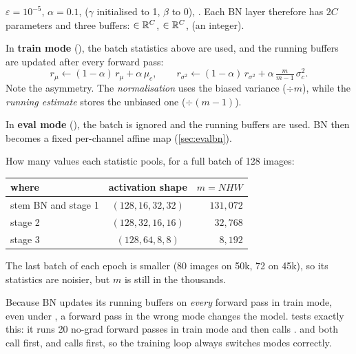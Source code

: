 \begin{repo}
$\varepsilon = 10^{-5}$,  $\alpha=0.1$,  ($\gamma$ initialised to 1, $\beta$ to 0), . Each BN layer therefore has $2C$ parameters and three buffers:  $\in\mathbb{R}^C$,  $\in\mathbb{R}^C$,  (an integer).

In \textbf{train mode} (), the batch statistics above are used, and the running buffers are updated after every forward pass:
\[
  r_\mu \leftarrow (1-\alpha)\,r_\mu + \alpha\,\mu_c, \qquad
  r_{\sigma^2} \leftarrow (1-\alpha)\,r_{\sigma^2} + \alpha\,\tfrac{m}{m-1}\,\sigma_c^2 .
\]
Note the asymmetry. The \emph{normalisation} uses the biased variance ($\div m$), while the \emph{running estimate} stores the unbiased one ($\div(m-1)$).

In \textbf{eval mode} (), the batch is ignored and the running buffers are used. BN then becomes a fixed per-channel affine map (\cref{sec:evalbn}).

How many values each statistic pools, for a full batch of 128 images:
\begin{center}
\begin{tabular}{@{}lcr@{}}
\toprule
where & activation shape & $m=N H W$\\
\midrule
stem BN and stage 1 & $(128,16,32,32)$ & $131{,}072$\\
stage 2 & $(128,32,16,16)$ & $32{,}768$\\
stage 3 & $(128,64,8,8)$ & $8{,}192$\\
\bottomrule
\end{tabular}
\end{center}
The last batch of each epoch is smaller (80 images on 50k, 72 on 45k), so its statistics are noisier, but $m$ is still in the thousands.
\end{repo}

\begin{warn}
Because BN updates its running buffers on \emph{every} forward pass in train mode, even under , a forward pass in the wrong mode changes the model.  tests exactly this: it runs 20 no-grad forward passes in train mode and then calls .  and  both call  first, and  calls  first, so the training loop always switches modes correctly.
\end{warn}

